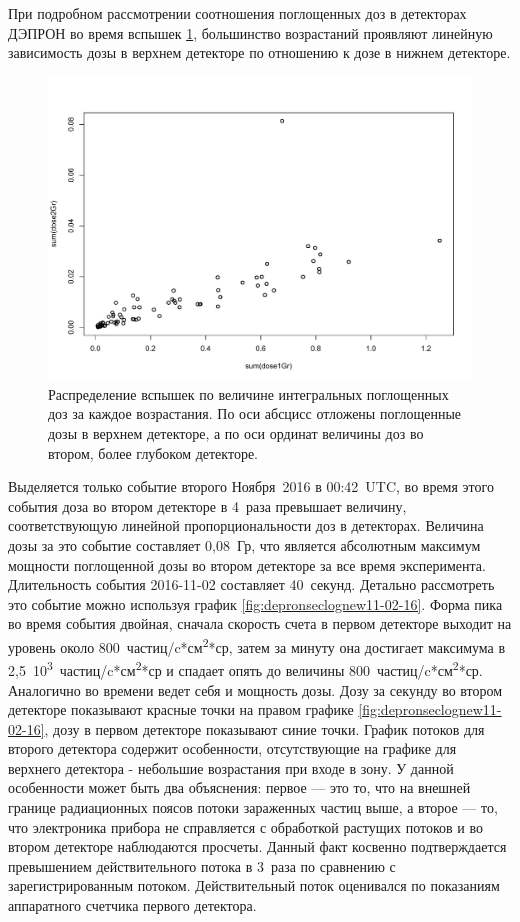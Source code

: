 При подробном рассмотрении соотношения поглощенных доз в детекторах ДЭПРОН во время вспышек \ref{fig:rplot03}, большинство возрастаний проявляют линейную зависимость дозы в верхнем детекторе по отношению к дозе в нижнем детекторе.
\begin{figure}
	\centering
	\includegraphics[width=0.7\linewidth]{images/Flash/Rplot03}
	\caption{Распределение вспышек по величине интегральных поглощенных доз за каждое возрастания. По оси абсцисс отложены поглощенные дозы в верхнем детекторе, а по оси ординат величины доз во втором, более глубоком детекторе.}
	\label{fig:rplot03}
\end{figure} 
Выделяется только событие второго Ноября~2016 в 00:42~UTC, во время этого события доза во втором детекторе в 4~раза превышает величину, соответствующую линейной пропорциональности доз в детекторах. Величина дозы за это событие составляет 0,08~Гр, что является абсолютным максимум мощности поглощенной дозы во втором детекторе за все время эксперимента. Длительность события 2016-11-02 составляет 40~секунд. Детально рассмотреть это событие можно используя график 	\ref{fig:depronseclognew11-02-16}. Форма пика во время события двойная, сначала скорость счета в первом детекторе выходит на уровень около 800~частиц/c*см\textsuperscript{2}*ср, затем за минуту она достигает максимума в 2,5~10\textsuperscript{3}~частиц/c*см\textsuperscript{2}*ср и спадает опять до величины 800~частиц/c*см\textsuperscript{2}*ср. Аналогично во времени ведет себя и мощность дозы.  Дозу за секунду во втором детекторе показывают красные точки на правом графике \ref{fig:depronseclognew11-02-16}, дозу в первом детекторе показывают синие точки. График потоков для второго детектора содержит особенности, отсутствующие на графике для верхнего детектора - небольшие возрастания при входе в зону. У данной особенности может быть два объяснения: первое --- это то, что на внешней границе радиационных поясов потоки зараженных частиц выше, а второе --- то, что электроника прибора не справляется с обработкой растущих потоков и во втором детекторе наблюдаются просчеты. Данный факт косвенно подтверждается превышением действительного потока в 3~раза по сравнению с зарегистрированным потоком. Действительный поток оценивался по показаниям аппаратного счетчика первого детектора.

